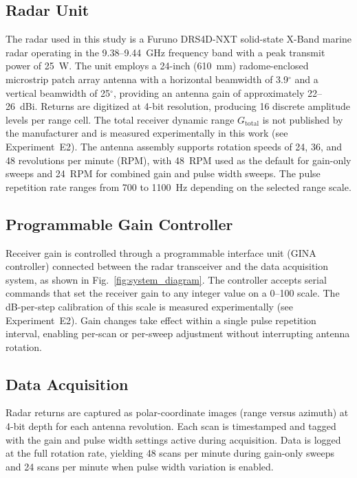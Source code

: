 \documentclass[twocolumn, 10pt]{article}
\begin{document}
\subsection{Radar Unit}
The radar used in this study is a Furuno DRS4D-NXT solid-state X-Band marine radar operating in the 9.38--9.44~GHz frequency band with a peak transmit power of 25~W. The unit employs a 24-inch (610~mm) radome-enclosed microstrip patch array antenna with a horizontal beamwidth of 3.9$^\circ$ and a vertical beamwidth of 25$^\circ$, providing an antenna gain of approximately 22--26~dBi. Returns are digitized at 4-bit resolution, producing 16 discrete amplitude levels per range cell. The total receiver dynamic range $G_{\text{total}}$ is not published by the manufacturer and is measured experimentally in this work (see Experiment~E2). The antenna assembly supports rotation speeds of 24, 36, and 48 revolutions per minute (RPM), with 48~RPM used as the default for gain-only sweeps and 24~RPM for combined gain and pulse width sweeps. The pulse repetition rate ranges from 700 to 1100~Hz depending on the selected range scale.


\subsection{Programmable Gain Controller}
Receiver gain is controlled through a programmable interface unit (GINA controller) connected between the radar transceiver and the data acquisition system, as shown in Fig.~\ref{fig:system_diagram}. The controller accepts serial commands that set the receiver gain to any integer value on a 0--100 scale. The dB-per-step calibration of this scale is measured experimentally (see Experiment~E2). Gain changes take effect within a single pulse repetition interval, enabling per-scan or per-sweep adjustment without interrupting antenna rotation.


\subsection{Data Acquisition}
Radar returns are captured as polar-coordinate images (range versus azimuth) at 4-bit depth for each antenna revolution. Each scan is timestamped and tagged with the gain and pulse width settings active during acquisition. Data is logged at the full rotation rate, yielding 48 scans per minute during gain-only sweeps and 24 scans per minute when pulse width variation is enabled.
\end{document}
